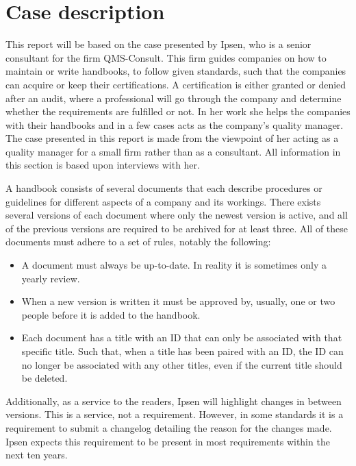 \section{Case description} \label{sec:CaseDescription}

This report will be based on the case presented by Ipsen, who is a senior consultant for the firm QMS-Consult.
This firm guides companies on how to maintain or write handbooks, to follow given standards, such that the companies can acquire or keep their certifications.
A certification is either granted or denied after an audit, where a professional will go through the company and determine whether the requirements are fulfilled or not.
In her work she helps the companies with their handbooks and in a few cases acts as the company's quality manager.
The case presented in this report is made from the viewpoint of her acting as a quality manager for a small firm rather than as a consultant.
All information in this section is based upon interviews with her.

A handbook consists of several documents that each describe procedures or guidelines for different aspects of a company and its workings.
There exists several versions of each document where only the newest version is active, and all of the previous versions are required to be archived for at least three.
All of these documents must adhere to a set of rules, notably the following:

\begin{itemize}
	\item
	A document must always be up-to-date.
	In reality it is sometimes only a yearly review.
	\item
	When a new version is written it must be approved by, usually, one or two people before it is added to the handbook.
	\item
	Each document has a title with an ID that can only be associated with that specific title.
	Such that, when a title has been paired with an ID, the ID can no longer be associated with any other titles, even if the current title should be deleted.
\end{itemize}

Additionally, as a service to the readers, Ipsen will highlight changes in between versions.
This is a service, not a requirement.
However, in some standards it is a requirement to submit a changelog detailing the reason for the changes made.
Ipsen expects this requirement to be present in most requirements within the next ten years.

